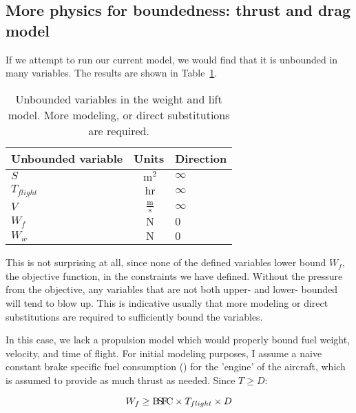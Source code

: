 \subsection{More physics for boundedness: thrust and drag model}
\label{s:td}

If we attempt to run our current model, we would find that it is unbounded in many variables.
The results are shown in Table~\ref{t:WandL_unbounded}.

\begin{footnotesize}
\begin{table}
    \centering
    \begin{tabular}{ l c l }
        \toprule
        Unbounded variable & Units & Direction \\
        \midrule
        $S$ & $~\mathrm{m^{2}}$ & $\infty$ \\
        $T_{flight}$ & $~\mathrm{hr}$ & $\infty$ \\
        $V$ &  $~\mathrm{\tfrac{m}{s}}$  & $\infty$ \\
        $W_f$ & $~\mathrm{N}$ & $0$ \\
        $W_w$ & $~\mathrm{N}$  & $0$ \\
        \bottomrule
    \end{tabular}
    \caption{Unbounded variables in the weight and lift model. More modeling, or direct
    substitutions are required.}
    \label{t:WandL_unbounded}
\end{table} \end{footnotesize}

This is not surprising at all, since none of the defined variables lower bound $W_f$,
the objective function, in the constraints we have defined.
Without the pressure from the objective, any variables that
are not both upper- and lower- bounded will tend to blow up. This is indicative usually
that more modeling or direct substitutions are required to sufficiently bound the variables.

In this case, we lack a propulsion model which would properly bound fuel weight, velocity,
and time of flight. For initial modeling purposes, I assume a naive constant brake
specific fuel consumption (\BSFC) for the 'engine' of the aircraft, which is assumed
to provide as much thrust as needed. Since $T \geq D$:

\begin{equation}
    W_f \geq {\rm B\!S\!F\!C} \times T_{flight} \times D
    \label{e:W_f}
\end{equation}

